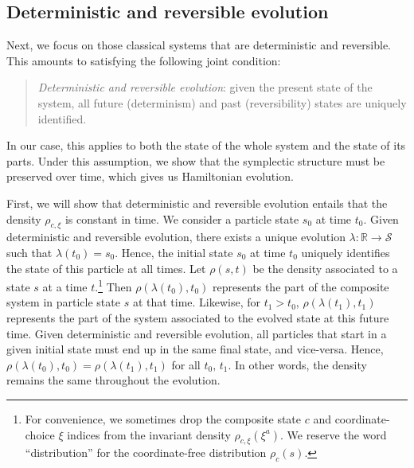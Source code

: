 \documentclass[12pt, twoside]{article}
\newcommand\bs{\begin{singlespace}}
\newcommand\es{\end{singlespace}}
\begin{document}


\subsection{Deterministic and reversible evolution}
\label{deterministic}

Next, we focus on those classical systems that are deterministic and reversible. This amounts to satisfying the following joint condition:

\begin{quotation}
\bs
\noindent
\textit{Deterministic and reversible evolution}: given the present state of the system, all future (determinism) and past (reversibility) states are uniquely identified. \es
\end{quotation}

\noindent In our case, this applies to both the state of the whole system and the state of its parts. {\color{green} Under this assumption, we show that the symplectic structure must be preserved over time, which gives us Hamiltonian evolution.}

First, we will show that deterministic and reversible evolution entails that the density $\rho_{c, \xi}$ is constant in time. We consider a particle state $s_0$ at time $t_0$. Given deterministic and reversible evolution, there exists a unique evolution $\lambda: \mathbb{R} \to \mathcal{S}$ such that $\lambda(t_0) = s_0$. Hence, the initial state $s_0$ at time $t_0$ uniquely identifies the state of this particle at all times. Let $\rho(s, t)$ be the density associated to a state $s$ at a time $t$.\footnote{For convenience, we sometimes drop the composite state $c$ and coordinate-choice $\xi$ indices from the invariant density $\rho_{c, \xi} (\xi^a)$. We reserve the word ``distribution'' for the coordinate-free distribution $\rho_c (s)$. } Then  $\rho(\lambda(t_0), t_0)$ represents the part of the composite system in particle state $s$ at that time. Likewise, for $t_1 > t_0$,  $\rho(\lambda(t_1), t_1)$ represents the part of the system associated to the evolved state at this future time. Given deterministic and reversible evolution, all particles that start in a given initial state must end up in the same final state, and vice-versa. Hence, $\rho(\lambda(t_0), t_0) = \rho(\lambda(t_1), t_1)$ for all $t_0,\, t_1$. In other words, the density remains the same throughout the evolution.
\end{document}
